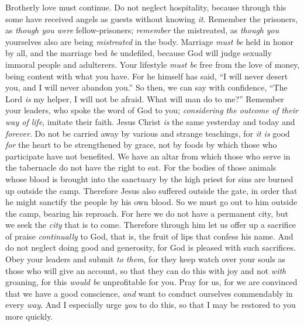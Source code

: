 \begin{biblechapter} %
 Brotherly love must continue.
\verse Do not neglect hospitality, because through this some have received angels as guests without knowing \textit{it}.
\verse Remember the prisoners, as \textit{though you were} fellow-prisoners; \textit{remember} the mistreated, as \textit{though} \textit{you} yourselves also are being \textit{mistreated} in the body.
\verse Marriage \textit{must be} held in honor by all, and the marriage bed \textit{be} undefiled, because God will judge sexually immoral people and adulterers.
\verse Your lifestyle \textit{must be} free from the love of money, being content with what you have. For he himself has said, “I will never desert you, and I will never abandon you.”
\verse So then, we can say with confidence, “The Lord \textit{is} my helper, I will not be afraid. 
What will man do to me?”
\verse Remember your leaders, who spoke the word of God to you; \textit{considering the outcome of their way of life}, imitate their faith.
\verse Jesus Christ \textit{is} the same yesterday and today and \textit{forever}.
\verse Do not be carried away by various and strange teachings, for \textit{it is} good \textit{for} the heart to be strengthened by grace, not by foods by which those who participate have not benefited.
\verse We have an altar from which those who serve in the tabernacle do not have the right to eat.
\verse For the bodies of those animals whose blood is brought into the sanctuary by the high priest for sins are burned up outside the camp.
\verse Therefore Jesus also suffered outside the gate, in order that he might sanctify the people by his own blood.
\verse So we must go out to him outside the camp, bearing his reproach.
\verse For here we do not have a permanent city, but we seek the \textit{city} that is to come.
\verse Therefore through him let us offer up a sacrifice of praise \textit{continually} to God, that is, the fruit of lips that confess his name.
\verse And do not neglect doing good and generosity, for God is pleased with such sacrifices.
\verse Obey your leaders and submit \textit{to them}, for they keep watch over your souls as those who will give an account, so that they can do this with joy and not \textit{with} groaning, for this \textit{would be} unprofitable for you.
\verse Pray for us, for we are convinced that we have a good conscience, \textit{and} want to conduct ourselves commendably in every \textit{way}.
\verse And I especially urge \textit{you} to do this, so that I may be restored to you more quickly.

\end{biblechapter}

